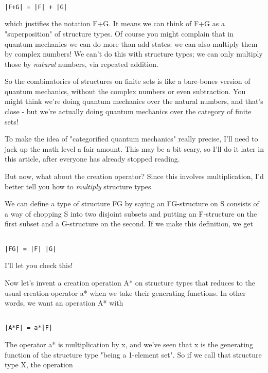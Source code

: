 \begin{verbatim}

|F+G| = |F| + |G| 
\end{verbatim}
    

which justifies the notation F+G.  It means we can think of F+G as a
"superposition" of structure types.  Of course you might
complain that in quantum mechanics we can do more than add states: we
can also multiply them by complex numbers!  We can't do this with
structure types; we can only multiply those by \emph{natural} numbers, via
repeated addition.

So the combinatorics of structures on finite sets is like a bare-bones
version of quantum mechanics, without the complex numbers or even
subtraction.  You might think we're doing quantum mechanics over the
natural numbers, and that's close - but we're actually doing quantum
mechanics over the category of finite sets!   

To make the idea of "categorified quantum mechanics" really precise,
I'll need to jack up the math level a fair amount.  This may be a bit
scary, so I'll do it later in this article, after everyone has already
stopped reading.

But now, what about the creation operator?  Since this involves
multiplication, I'd better tell you how to \emph{multiply} structure types.

We can define a type of structure FG by saying an FG-structure on S
consists of a way of chopping S into two disjoint subsets and putting an
F-structure on the first subset and a G-structure on the second.  If we
make this definition, we get


\begin{verbatim}

|FG| = |F| |G|
\end{verbatim}
    
I'll let you check this!

Now let's invent a creation operation A* on structure types that reduces
to the usual creation operator a* when we take their generating
functions.  In other words, we want an operation A* with 


\begin{verbatim}

|A*F| = a*|F|
\end{verbatim}
    
The operator a* is multiplication by x, and we've seen that x is the
generating function of the structure type "being a 1-element set".   
So if we call that structure type X, the operation


